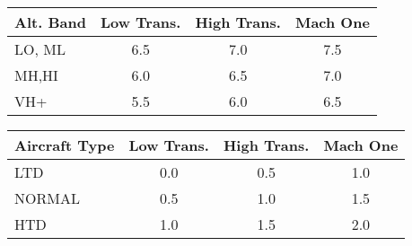 \begin{onecolumntablefloat}[p]
\begin{onecolumntable}
\begin{tabularx}{1.0\linewidth}{Xccc}
\toprule
Alt. Band&Low Trans.&High Trans.&Mach One\\
\midrule
LO, ML&6.5&7.0&7.5\\
MH,HI&6.0&6.5&7.0\\
VH+&5.5&6.0&6.5\\
\bottomrule
\end{tabularx}
\end{onecolumntable}
\end{onecolumntablefloat}

\begin{onecolumntablefloat}[p]
\begin{onecolumntable}
\begin{tabularx}{1.0\linewidth}{Xccc}
\toprule
Aircraft Type&Low Trans.&High Trans.&Mach One\\
\midrule
LTD&0.0&0.5&1.0\\
NORMAL&0.5&1.0&1.5\\
HTD&1.0&1.5&2.0\\
\bottomrule
\end{tabularx}
\end{onecolumntable}
\end{onecolumntablefloat}

